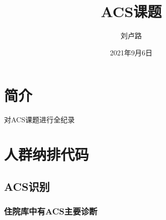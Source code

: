 \documentclass[
]{book}
\title{ACS课题}
\author{刘卢路}
\date{2021年9月6日}
\begin{document}
\maketitle

{
\setcounter{tocdepth}{1}
\tableofcontents
}
\hypertarget{ux7b80ux4ecb}{%
\chapter*{简介}\label{ux7b80ux4ecb}}

对ACS课题进行全纪录

\hypertarget{ux4ebaux7fa4ux7eb3ux6392ux4ee3ux7801}{%
\chapter{人群纳排代码}\label{ux4ebaux7fa4ux7eb3ux6392ux4ee3ux7801}}

\hypertarget{acsux8bc6ux522b}{%
\section{ACS识别}\label{acsux8bc6ux522b}}

\hypertarget{ux4f4fux9662ux5e93ux4e2dux6709acsux4e3bux8981ux8bcaux65ad}{%
\subsection{住院库中有ACS主要诊断}\label{ux4f4fux9662ux5e93ux4e2dux6709acsux4e3bux8981ux8bcaux65ad}}
\end{document}
